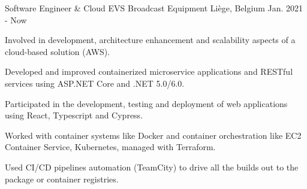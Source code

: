 
\begin{cventries}

  \cventry
    {Software Engineer \& Cloud} %
    {EVS Broadcast Equipment} %
    {Liège, Belgium} %
    {Jan. 2021 - Now} %
    {
      \begin{cvitems} %
        \item{Involved in development, architecture enhancement and scalability aspects of a cloud-based solution (AWS).}
        \item{Developed and improved containerized microservice applications and RESTful services using ASP.NET Core and .NET 5.0/6.0.}
        \item{Participated in the development, testing and deployment of web applications using React, Typescript and Cypress.}
        \item{Worked with container systems like Docker and container orchestration like EC2 Container Service, Kubernetes, managed with Terraform.}
        \item{Used CI/CD pipelines automation (TeamCity) to drive all the builds out to the package or container registries.}
      \end{cvitems}
    }


\end{cventries}

